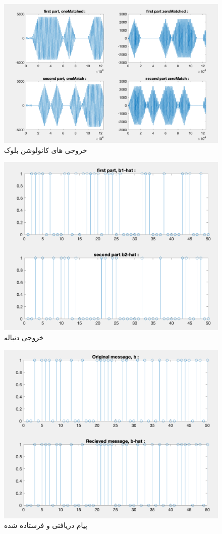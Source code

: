 \documentclass[10pt]{article}
\begin{document}
	
	\begin{figure}[h]
		\centering
		\includegraphics[width=0.6\linewidth]{../img/3.3.6}
		\caption{خروجی های کانولوشن بلوک 
			}
		\label{fig:3-3-6}
	\end{figure}
	
	\begin{figure}[h]
		\centering
		\includegraphics[width=0.5\linewidth]{../img/3.3.7}
		\caption{خروجی دنباله 
			}
		\label{fig:3-3-7}
	\end{figure}
	
	\begin{figure}[h]
		\centering
		\includegraphics[width=0.7\linewidth]{../img/3.3.8}
		\caption{پیام دریافتی و فرستاده شده}
		\label{fig:3-3-8}
	\end{figure}
	
\end{document}
